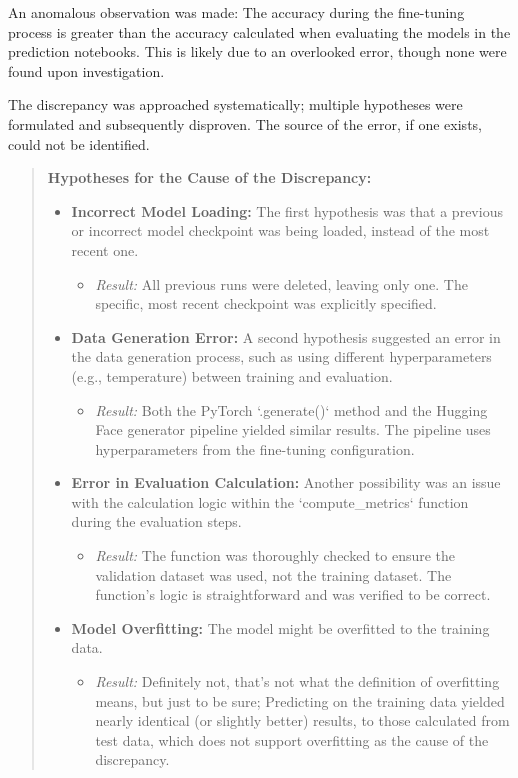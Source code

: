 \documentclass{article}
\begin{document}
An anomalous observation was made: The accuracy during the fine-tuning process is greater than the accuracy calculated when evaluating the models in the prediction notebooks. This is likely due to an overlooked error, though none were found upon investigation.

The discrepancy was approached systematically; multiple hypotheses were formulated and subsequently disproven. The source of the error, if one exists, could not be identified.

\begin{quote}
\footnotesize{
\textbf{Hypotheses for the Cause of the Discrepancy:}
\begin{itemize}
    \item \textbf{Incorrect Model Loading:} The first hypothesis was that a previous or incorrect model checkpoint was being loaded, instead of the most recent one.
        \begin{itemize}
            \item \textit{Result:} All previous runs were deleted, leaving only one. The specific, most recent checkpoint was explicitly specified.
        \end{itemize}

    \item \textbf{Data Generation Error:} A second hypothesis suggested an error in the data generation process, such as using different hyperparameters (e.g., temperature) between training and evaluation.
        \begin{itemize}
            \item \textit{Result:} Both the PyTorch `.generate()` method and the Hugging Face generator pipeline yielded similar results. The pipeline uses hyperparameters from the fine-tuning configuration.
        \end{itemize}

    \item \textbf{Error in Evaluation Calculation:} Another possibility was an issue with the calculation logic within the `compute\_metrics` function during the evaluation steps.
        \begin{itemize}
            \item \textit{Result:} The function was thoroughly checked to ensure the validation dataset was used, not the training dataset. The function's logic is straightforward and was verified to be correct.
        \end{itemize}

    \item \textbf{Model Overfitting:} The model might be overfitted to the training data.
        \begin{itemize}
            \item \textit{Result:} Definitely not, that's not what the definition of overfitting means, but just to be sure; Predicting on the training data yielded nearly identical (or slightly better) results, to those calculated from test data, which does not support overfitting as the cause of the discrepancy.
        \end{itemize}
    

\end{itemize}}
\end{quote}
\end{document}
